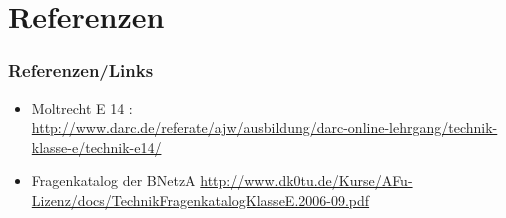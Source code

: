 \section*{Referenzen}
\begin{frame}
    \frametitle{Referenzen/Links}
    \footnotesize
    \begin{itemize}
        \item Moltrecht E 14 : \\
              \url{http://www.darc.de/referate/ajw/ausbildung/darc-online-lehrgang/technik-klasse-e/technik-e14/}
		\item Fragenkatalog der BNetzA
			\url{http://www.dk0tu.de/Kurse/AFu-Lizenz/docs/TechnikFragenkatalogKlasseE.2006-09.pdf}
    \end{itemize}
\end{frame}


